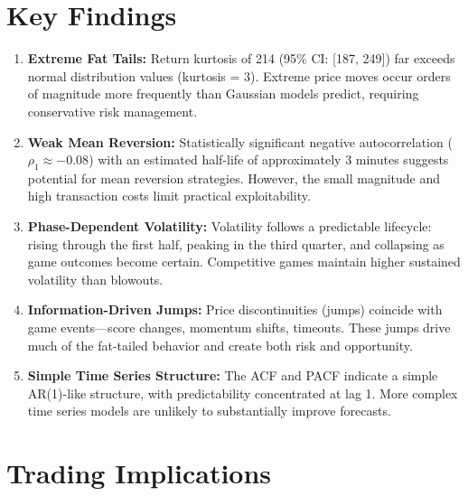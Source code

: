 \section{Key Findings}

\begin{keyfindings}
\begin{enumerate}
    \item \textbf{Extreme Fat Tails:} Return kurtosis of 214 (95\% CI: [187, 249]) far exceeds normal distribution values (kurtosis = 3). Extreme price moves occur orders of magnitude more frequently than Gaussian models predict, requiring conservative risk management.

    \item \textbf{Weak Mean Reversion:} Statistically significant negative autocorrelation ($\rho_1 \approx -0.08$) with an estimated half-life of approximately 3 minutes suggests potential for mean reversion strategies. However, the small magnitude and high transaction costs limit practical exploitability.

    \item \textbf{Phase-Dependent Volatility:} Volatility follows a predictable lifecycle: rising through the first half, peaking in the third quarter, and collapsing as game outcomes become certain. Competitive games maintain higher sustained volatility than blowouts.

    \item \textbf{Information-Driven Jumps:} Price discontinuities (jumps) coincide with game events---score changes, momentum shifts, timeouts. These jumps drive much of the fat-tailed behavior and create both risk and opportunity.

    \item \textbf{Simple Time Series Structure:} The ACF and PACF indicate a simple AR(1)-like structure, with predictability concentrated at lag 1. More complex time series models are unlikely to substantially improve forecasts.
\end{enumerate}
\end{keyfindings}

\section{Trading Implications}


